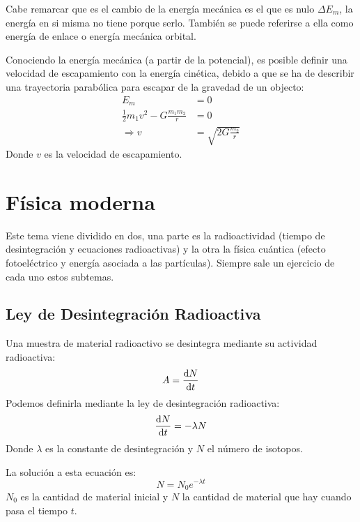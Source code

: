 \documentclass[arial,a4paper,print]{article}
\begin{document}
Cabe remarcar que es el cambio de la energía mecánica es el que es nulo $\Delta E_{m}$, la energía en si misma no tiene porque serlo. También se puede referirse a ella como energía de enlace o energía mecánica orbital.

Conociendo la energía mecánica (a partir de la potencial), es posible definir una velocidad de escapamiento con la energía cinética, debido a que se ha de describir una trayectoria parabólica para escapar de la gravedad de un objecto:
\begin{align*}
	E_{m} &= 0 \\
	\frac12m_{1}v^2 - G\frac{m_{1}m_{2}}{r} &= 0  \\
	\Rightarrow v &= \sqrt{2G\frac{m_{2}}{r}}
\end{align*}
Donde $ v$ es la velocidad de escapamiento.
\pagebreak

\section{Física moderna}
Este tema viene dividido en dos, una parte es la radioactividad (tiempo de desintegración y ecuaciones radioactivas) y la otra la física cuántica (efecto fotoeléctrico y energía asociada a las partículas). Siempre sale un ejercicio de cada uno estos subtemas.

\subsection{Ley de Desintegración Radioactiva}
Una muestra de material radioactivo se desintegra mediante su actividad radioactiva:
\begin{equation*}
	A = \dv{N}{t}
\end{equation*}
Podemos definirla mediante la ley de desintegración radioactiva:
\begin{equation*}
	\dv{N}{t} = -\lambda N
\end{equation*}
Donde $\lambda$ es la constante de desintegración y $N$ el número de isotopos.

La solución a esta ecuación es:
\begin{equation*}
	N = N_{0}e^{-\lambda t}
\end{equation*}
$N_{0}$ es la cantidad de material inicial y $N$ la cantidad de material que hay cuando pasa el tiempo $t$.
\end{document}
